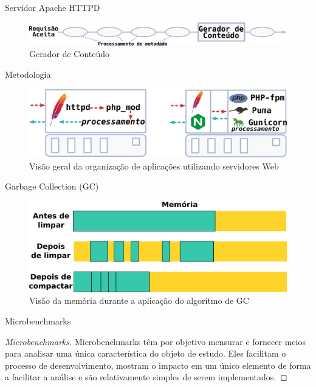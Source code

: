 \documentclass[xcolor={usenames,svgnames,dvipsnames},brazil,english,12pt,aspectratio=149]{beamer}
\begin{document}
\begin{frame}{Servidor Apache HTTPD}
  \begin{figure}[!h]
    \centering
    \includegraphics[width=\textwidth]{request_phases} 
    \caption*{Gerador de Conteúdo}
  \end{figure}
\end{frame}

\begin{frame}{Metodologia}
  \begin{figure}[!h] \centering
    \includegraphics[width=\textwidth]{web_server_organization_strategy}
    \caption*{Visão geral da organização de aplicações utilizando servidores Web}
  \end{figure}
\end{frame}

\begin{frame}{Garbage Collection (GC)}
  \begin{figure}[!h]
    \centering
    \includegraphics[width=\textwidth]{gc_memory}
    \caption*{Visão da memória durante a aplicação do algoritmo de GC}
  \end{figure}
\end{frame}

\begin{frame}{Microbenchmarks}
  \begin{proof}[Microbenchmarks]
Microbenchmarks têm por objetivo mensurar e fornecer meios para analisar uma
única característica do objeto de estudo. Eles facilitam o processo de
desenvolvimento, mostram o impacto em um único elemento de forma a facilitar a
análise e são relativamente simples de serem implementados.
  \end{proof}
\end{frame}
\end{document}
